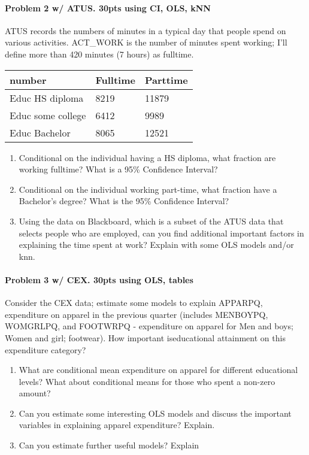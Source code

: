 \documentclass[]{article}
\providecommand{\tightlist}{%
  \setlength{\itemsep}{0pt}\setlength{\parskip}{0pt}}
\let\oldparagraph\paragraph
\renewcommand{\paragraph}[1]{\oldparagraph{#1}\mbox{}}
\begin{document}
\paragraph{Problem 2 w/ ATUS. 30pts using CI, OLS,
kNN}\label{problem-2-w-atus.-30pts-using-ci-ols-knn}

ATUS records the numbers of minutes in a typical day that people spend
on various activities. ACT\_WORK is the number of minutes spent working;
I'll define more than 420 minutes (7 hours) as fulltime.

\begin{longtable}[]{@{}lll@{}}
\toprule
number & Fulltime & Parttime\tabularnewline
\midrule
\endhead
Educ HS diploma & 8219 & 11879\tabularnewline
Educ some college & 6412 & 9989\tabularnewline
Educ Bachelor & 8065 & 12521\tabularnewline
\bottomrule
\end{longtable}

\begin{enumerate}
\def\labelenumi{\alph{enumi}.}
\tightlist
\item
  Conditional on the individual having a HS diploma, what fraction are
  working fulltime? What is a 95\% Confidence Interval?
\item
  Conditional on the individual working part-time, what fraction have a
  Bachelor's degree? What is the 95\% Confidence Interval?
\item
  Using the data on Blackboard, which is a subset of the ATUS data that
  selects people who are employed, can you find additional important
  factors in explaining the time spent at work? Explain with some OLS
  models and/or knn.
\end{enumerate}

\paragraph{Problem 3 w/ CEX. 30pts using OLS,
tables}\label{problem-3-w-cex.-30pts-using-ols-tables}

Consider the CEX data; estimate some models to explain APPARPQ,
expenditure on apparel in the previous quarter (includes MENBOYPQ,
WOMGRLPQ, and FOOTWRPQ - expenditure on apparel for Men and boys; Women
and girl; footwear). How important iseducational attainment on this
expenditure category?

\begin{enumerate}
\def\labelenumi{\alph{enumi}.}
\tightlist
\item
  What are conditional mean expenditure on apparel for different
  educational levels? What about conditional means for those who spent a
  non-zero amount?
\item
  Can you estimate some interesting OLS models and discuss the important
  variables in explaining apparel expenditure? Explain.
\item
  Can you estimate further useful models? Explain
\end{enumerate}
\end{document}
